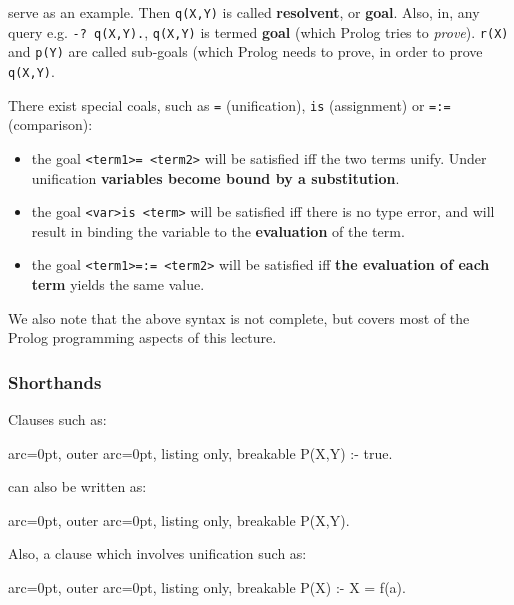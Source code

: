 serve as an example. Then \texttt{q(X,Y)} is called \textbf{resolvent}, or \textbf{goal}. Also, in, any query e.g. \texttt{-? q(X,Y).}, \texttt{q(X,Y)} is termed \textbf{goal} (which Prolog tries to \textit{prove}). \texttt{r(X)} and \texttt{p(Y)} are called sub-goals (which Prolog needs to prove, in order to prove \texttt{q(X,Y)}.

There exist special coals, such as \texttt{=} (unification), \texttt{is} (assignment) or \texttt{=:=} (comparison):
\begin{itemize}
	\item  the goal \texttt{\textless term1\textgreater  = \textless term2\textgreater } will be satisfied iff the two terms unify. Under unification \textbf{variables become bound by a substitution}.
	\item  the goal \texttt{\textless var\textgreater  is \textless term\textgreater } will be satisfied iff there is no type error, and will result in binding the variable to the \textbf{evaluation} of the term.
	\item  the goal \texttt{\textless term1\textgreater  =:= \textless term2\textgreater } will be satisfied iff \textbf{the evaluation of each term} yields the same value.
\end{itemize}

We also note that the above syntax is not complete, but covers most of the Prolog programming aspects of this lecture.

\subsubsection*{ Shorthands }

Clauses such as:

\begin{tcblisting}{ arc=0pt, outer arc=0pt, listing only, breakable}
P(X,Y) :- true.

\end{tcblisting}


can also be written as:

\begin{tcblisting}{ arc=0pt, outer arc=0pt, listing only, breakable}
P(X,Y).

\end{tcblisting}


Also, a clause which involves unification such as:

\begin{tcblisting}{ arc=0pt, outer arc=0pt, listing only, breakable}
P(X) :- X = f(a). 

\end{tcblisting}



